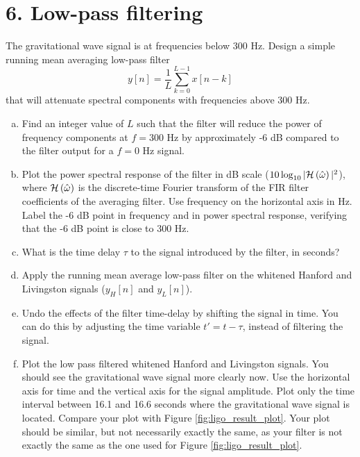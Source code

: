 \section{6. Low-pass filtering}

The gravitational wave signal is at frequencies below 300 Hz. Design a simple running mean averaging low-pass filter
\begin{equation}
y[n] = \frac{1}{L} \sum_{k=0}^{L-1}x[n-k]
\end{equation}
that will attenuate spectral components with frequencies above 300 Hz. 
\begin{enumerate}[a)]
\item Find an integer value of $L$ such that the filter will reduce the power of frequency components at $f=300$ Hz by approximately -6 dB compared to the filter output for a $f=0$ Hz signal.
  
\item Plot the power spectral response of the filter in dB scale ($10\log_{10}|\mathcal{H}\left(\hat{\omega}\right)|^2$), where $\mathcal{H}\left(\hat{\omega}\right)$ is the discrete-time Fourier transform of the FIR filter coefficients of the averaging filter. Use frequency on the horizontal axis in Hz. Label the -6 dB point in frequency and in power spectral response, verifying that the -6 dB point is close to 300 Hz.

\item What is the time delay $\tau$ to the signal introduced by the filter, in seconds?

\item Apply the running mean average low-pass filter on the whitened
  Hanford and Livingston signals ($y_H[n]$ and $y_L[n]$).

\item Undo the effects of the filter time-delay by shifting the signal in time. You can do this by adjusting the time variable $t'=t-\tau$, instead of filtering the signal.

\item Plot the low pass filtered whitened Hanford and Livingston signals. You should see the gravitational wave signal more clearly now. Use the horizontal axis for time and the vertical axis for the signal amplitude. Plot only the time interval between 16.1 and 16.6 seconds where the gravitational wave signal is located. Compare your plot with Figure \ref{fig:ligo_result_plot}. Your plot should be similar, but not necessarily exactly the same, as your filter is not exactly the same as the one used for Figure \ref{fig:ligo_result_plot}.



\end{enumerate}

